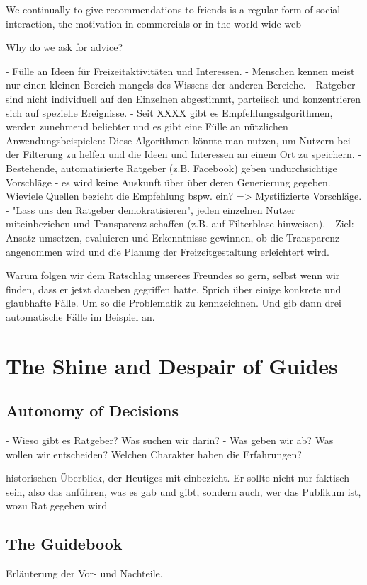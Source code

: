 \documentclass[12pt,numbers=noenddot,parskip,bibliography=totocnumbered,listof=totocnumbered]{scrreprt}
\begin{document}
We continually to give recommendations to friends is a regular form of social interaction, the motivation in commercials or in the world wide web 



Why do we ask for advice?

- Fülle an Ideen für Freizeitaktivitäten und Interessen.
- Menschen kennen meist nur einen kleinen Bereich mangels des Wissens der anderen Bereiche.
- Ratgeber sind nicht individuell auf den Einzelnen abgestimmt, parteiisch und konzentrieren sich auf spezielle Ereignisse.
- Seit XXXX gibt es Empfehlungsalgorithmen, werden zunehmend beliebter und es gibt eine Fülle an nützlichen Anwendungsbeispielen: Diese Algorithmen könnte man nutzen, um Nutzern bei der Filterung zu helfen und die Ideen und Interessen an einem Ort zu speichern.
- Bestehende, automatisierte Ratgeber (z.B. Facebook) geben undurchsichtige Vorschläge - es wird keine Auskunft über über deren Generierung gegeben. Wieviele Quellen bezieht die Empfehlung bspw. ein? => Mystifizierte Vorschläge.
- "Lass uns den Ratgeber demokratisieren", jeden einzelnen Nutzer miteinbeziehen und Transparenz schaffen (z.B. auf Filterblase hinweisen).
- Ziel: Ansatz umsetzen, evaluieren und Erkenntnisse gewinnen, ob die Transparenz angenommen wird und die Planung der Freizeitgestaltung erleichtert wird.

Warum folgen wir dem Ratschlag unserees Freundes so gern, selbst wenn wir finden, dass er jetzt daneben gegriffen hatte. Sprich über einige konkrete und glaubhafte Fälle. Um so die Problematik zu kennzeichnen. Und gib dann drei automatische Fälle im Beispiel an.

\chapter{The Shine and Despair of Guides}

\section{Autonomy of Decisions}
- Wieso gibt es Ratgeber? Was suchen wir darin?
- Was geben wir ab? Was wollen wir entscheiden? Welchen Charakter haben die Erfahrungen?

historischen Überblick, der Heutiges mit einbezieht. Er sollte nicht nur faktisch sein, also das anführen, was es gab und gibt, sondern auch, wer das Publikum ist, wozu Rat gegeben wird
\section{The Guidebook}
Erläuterung der Vor- und Nachteile.
\end{document}
